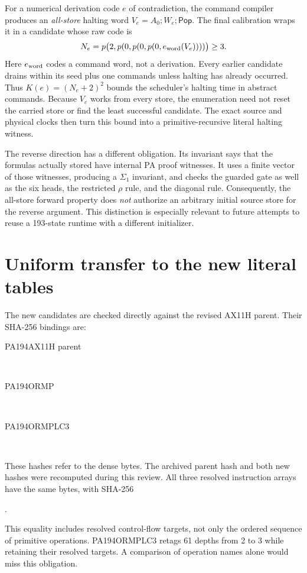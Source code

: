 \documentclass[11pt]{article}
\begin{document}
For a numerical derivation code \(e\) of contradiction, the command
compiler produces an \emph{all-store} halting word
\(V_e=A_0;W_e;\mathsf{Pop}\).  The final calibration wraps it in a
candidate whose raw code is
\[
 N_e=p\bigl(2,p(0,p(0,p(0,e_{\rm word}(V_e))))\bigr)\geq3.
\]
Here \(e_{\rm word}\) codes a command word, not a derivation.
Every earlier candidate drains within its seed plus one commands unless
halting has already occurred.  Thus
\(K(e)=(N_e+2)^2\) bounds the scheduler's halting time in abstract
commands.  Because \(V_e\) works from every store, the enumeration need
not reset the carried store or find the least successful candidate.
The exact source and physical clocks then turn this bound into a
primitive-recursive literal halting witness.\cite{ax11h,commands}

The reverse direction has a different obligation.  Its invariant says
that the formulas actually stored have internal PA proof witnesses.
It uses a finite vector of those witnesses, producing a
\(\Sigma_1\) invariant, and checks the guarded gate as well as the six
heads, the restricted \(\rho\) rule, and the diagonal rule.  Consequently,
the all-store forward property does \emph{not} authorize an arbitrary
initial source store for the reverse argument.  This distinction is
especially relevant to future attempts to reuse a 193-state runtime
with a different initializer.\cite{reverse}

\section{Uniform transfer to the new literal tables}

The new candidates are checked directly against the revised AX11H
parent.  Their SHA-256 bindings are:
\begin{description}
\item[PA194AX11H parent] \hfill\\[-1ex]
\item[PA194ORMP] \hfill\\[-1ex]
\item[PA194ORMPLC3] \hfill\\[-1ex]
\end{description}
These hashes refer to the dense  bytes.  The archived
parent hash and both new hashes were recomputed during this review.
All three resolved instruction arrays have the same bytes, with SHA-256
\begin{center}\small
{}.
\end{center}
This equality includes resolved control-flow targets, not only the
ordered sequence of primitive operations.  PA194ORMPLC3 retags 61
 depths from 2 to 3 while retaining their resolved
targets.  A comparison of operation names alone would miss this
obligation.
\end{document}
